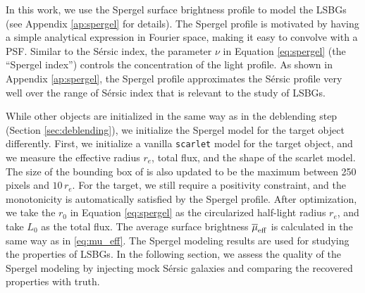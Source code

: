 \documentclass[twocolumn,astrosymb,twocolappendix]{aastex631}
\newcommand{\jiaxuan}[1]{\textcolor{orange}{\textbf{Jiaxuan: #1}}}
\newcommand{\code}[1]{\texttt{#1}}
\newcommand{\sersic}{S\'ersic}
\begin{document}
\begin{CJK*}{UTF8}{gbsn}
In this work, we use the Spergel surface brightness profile \citep{Spergel2010} to model the LSBGs (see Appendix \ref{ap:spergel} for details). The Spergel profile is motivated by having a simple analytical expression in Fourier space, making it easy to convolve with a PSF. Similar to the \sersic{} index, the parameter $\nu$ in Equation \eqref{eq:spergel} (the ``Spergel index'') controls the concentration of the light profile. As shown in Appendix \ref{ap:spergel}, the Spergel profile approximates the \sersic{} profile very well over the range of \sersic{} index that is relevant to the study of LSBGs.

While other objects are initialized in the same way as in the deblending step (Section \ref{sec:deblending}), we initialize the Spergel model for the target object differently. First, we initialize a vanilla \code{scarlet} model for the target object, and we measure the effective radius $r_e$, total flux, and the shape of the scarlet model. The size of the bounding box of is also updated to be the maximum between 250 pixels and $10\, r_e$. For the target, we still require a positivity constraint, and the monotonicity is automatically satisfied by the Spergel profile. After optimization, we take the $r_0$ in Equation \eqref{eq:spergel} as the circularized half-light radius $r_e$, and take $L_0$ as the total flux. The average surface brightness $\overline{\mu}_{\rm eff}$ is calculated in the same way as in \eqref{eq:mu_eff}. The Spergel modeling results are used for studying the properties of LSBGs. 
In the following section, we assess the quality of the Spergel modeling by injecting mock \sersic{} galaxies and comparing the recovered properties with truth. 



\end{CJK*}
\end{document}
